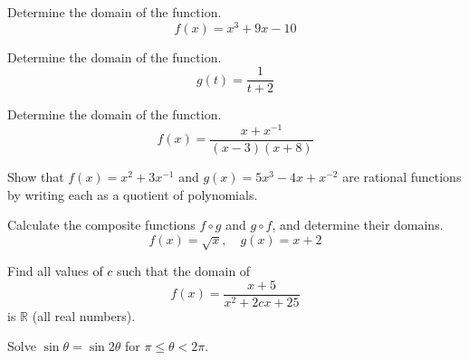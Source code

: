 \documentclass[12pt,addpoints, answers, fleqn]{exam}
\begin{document}
\begin{teacher}
\begin{questions}
Determine the domain of the function.
\[
f\left(x\right) = x^3 + 9x - 10
\]

\begin{solution}
\end{solution}

\question 	%

Determine the domain of the function.
\[
g\left(t\right) = \frac{1}{t + 2}
\]

\begin{solution}
\end{solution}

\question 	%

Determine the domain of the function.
\[
f\left(x\right) = \frac{x + x^{-1}}{\left(x - 3\right)\left(x + 8\right)}
\]


\begin{solution}
\end{solution}

\question 	%

Show that $f\left(x\right) = x^2 + 3x^{-1}$ and $g\left(x\right) = 5x^3 - 4x + x^{-2}$ are rational functions by writing each as a quotient of polynomials.
 
 
\begin{solution}
\end{solution}

\question 	%

Calculate the composite functions $f \circ g$ and $g \circ f$, and determine their domains.
\[
f\left(x\right) = \sqrt{x}, \quad g\left(x\right) = x + 2
\]

\begin{solution}
\end{solution}

\question 	%

Find all values of $c$ such that the domain of
\[ 
f\left(x\right) = \frac{x + 5}{x^2 + 2cx + 25}
\]
is $\mathbb{R}$ (all real numbers).
 
 
\begin{solution}
\end{solution}

\question 	%

Solve $\sin \theta = \sin 2 \theta$ for $\pi \leq \theta  < 2 \pi$.
 
\begin{solution}
\end{solution}




\end{questions}
\end{teacher}
\end{document}
